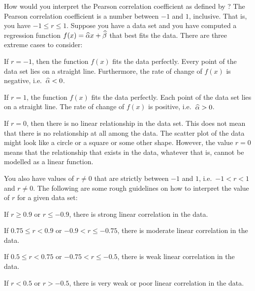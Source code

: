 \documentclass[a4paper,oneside,12pt]{article}
\begin{document}
How would you interpret the Pearson correlation coefficient as defined
by ?  The Pearson
correlation coefficient is a number between $-1$ and $1$, inclusive.
That is, you have $-1 \leq r \leq 1$.  Suppose you have a data set and
you have computed a regression function
$f(x) = \widehat{\alpha} x + \widehat{\beta}$ that best fits the data.  There are
three extreme cases to consider:
\begin{packedenumeral}
\item If $r = -1$, then the function $f(x)$ fits the data perfectly.
  Every point of the data set lies on a straight line.  Furthermore,
  the rate of change of $f(x)$ is negative, i.e.~$\widehat{\alpha} < 0$.

\item If $r = 1$, the function $f(x)$ fits the data perfectly.  Each
  point of the data set lies on a straight line.  The rate of change
  of $f(x)$ is positive, i.e.~$\widehat{\alpha} > 0$.

\item If $r = 0$, then there is no linear relationship in the data
  set.  This does not mean that there is no relationship at all among
  the data.  The scatter plot of the data might look like a circle or
  a square or some other shape.  However, the value $r = 0$ means that
  the relationship that exists in the data, whatever that is, cannot
  be modelled as a linear function.
\end{packedenumeral}
You also have values of $r \neq 0$ that are strictly between $-1$ and
$1$, i.e.~$-1 < r < 1$ and $r \neq 0$.  The following are some rough
guidelines on how to interpret the value of $r$ for a given data set:
\begin{packedenumeral}
\item If $r \geq 0.9$ or $r \leq -0.9$, there is strong linear
  correlation in the data.

\item If $0.75 \leq r < 0.9$ or $-0.9 < r \leq -0.75$, there is
  moderate linear correlation in the data.

\item If $0.5 \leq r < 0.75$ or $-0.75 < r \leq -0.5$, there is weak
  linear correlation in the data.

\item If $r < 0.5$ or $r > -0.5$, there is very weak or poor linear
  correlation in the data.
\end{packedenumeral}
\end{document}
